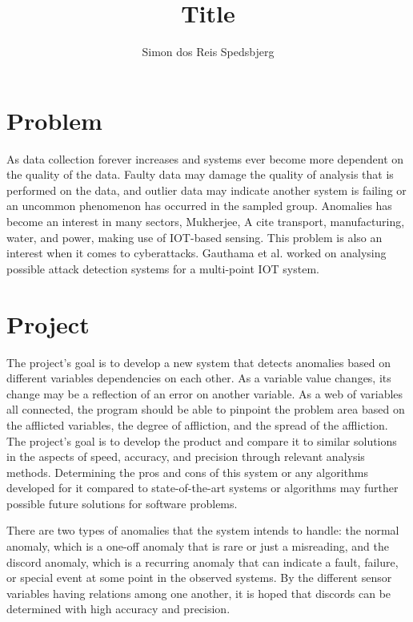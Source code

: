 \documentclass[a4paper,8pt]{article}
\title{Title}
\author{Simon dos Reis Spedsbjerg}
\begin{document}
	\maketitle
	
	\section{Problem}
		As data collection forever increases and systems ever become more dependent on the quality of the data. Faulty data may damage the quality of analysis that is performed on the data, and outlier data may indicate another system is failing or an uncommon phenomenon has occurred in the sampled group. Anomalies has become an interest in many sectors, Mukherjee, A\cite{MUKHERJEE2024102444} cite transport, manufacturing, water, and power, making use of IOT-based sensing. This problem is also an interest when it comes to cyberattacks. Gauthama et al. worked on analysing possible attack detection systems for a multi-point IOT system\cite{MR2022103046}.
	
	\section{Project}
		The project's goal is to develop a new system that detects anomalies based on different variables dependencies on each other. As a variable value changes, its change may be a reflection of an error on another variable. As a web of variables all connected, the program should be able to pinpoint the problem area based on the afflicted variables, the degree of affliction, and the spread of the affliction. The project's goal is to develop the product and compare it to similar solutions in the aspects of speed, accuracy, and precision through relevant analysis methods. Determining the pros and cons of this system or any algorithms developed for it compared to state-of-the-art systems or algorithms may further possible future solutions for software problems.
	
		There are two types of anomalies that the system intends to handle: the normal anomaly, which is a one-off anomaly that is rare or just a misreading, and the discord anomaly, which is a recurring anomaly that can indicate a fault, failure, or special event at some point in the observed systems. By the different sensor variables having relations among one another, it is hoped that discords can be determined with high accuracy and precision.
	\newpage
\end{document}
